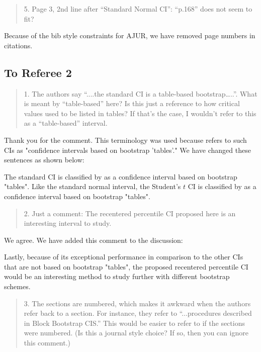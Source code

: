 \documentclass[12pt]{article}
\newenvironment{comment}%
{\begin{quotation}\noindent\small\it\color{darkblue}\ignorespaces%
}{\end{quotation}}
\begin{document}
\begin{comment}
5. Page 3, 2nd line after “Standard Normal CI”: “p.168” does not seem to fit?
\end{comment}

Because of the bib style constraints for AJUR, we have removed page numbers in 
citations.

\subsection*{To Referee 2}

\begin{comment}
1. The authors say “....the standard CI is a table-based bootstrap…..”.  
What is meant by “table-based” here?  Is this just a reference to how critical 
values used to be listed in tables?  If that’s the case, I wouldn’t refer to 
this as a “table-based” interval. 
\end{comment}

Thank you for the comment.  This terminology was used because 
\citet{efron1993introduction} refers to such CIs as 
"confidence intervals based on 
bootstrap 'tables'." We have changed these sentences as shown below:

The standard CI is classified by \citet{efron1993introduction} 
as a confidence interval based on bootstrap "tables".
Like the standard normal interval, the
Student's $t$ CI is classified by \citet{efron1993introduction} 
as a confidence interval based on bootstrap "tables".


\begin{comment}
2. Just a comment: The recentered percentile CI proposed here is an interesting 
interval to study. 
\end{comment}

We agree. We have added this comment to the discussion:

Lastly, because of its exceptional performance in comparison to the other 
CIs that are not based on bootstrap "tables", the proposed recentered percentile 
CI would be
an interesting method to study further with different bootstrap schemes.

\begin{comment}
3. The sections are numbered, which makes it awkward when the authors refer back 
to a section.  For instance, they refer to “...procedures described in Block 
Bootstrap CIS.”  This would be easier to refer to if the sections were numbered.  
(Is this a journal style choice?  If so, then you can ignore this comment.)
\end{comment}
\end{document}
